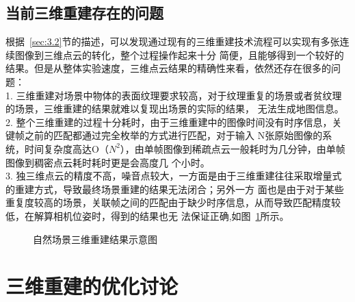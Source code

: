 \subsection{当前三维重建存在的问题}
\label{sec:3.2.3}
根据~\ref{sec:3.2}节的描述，可以发现通过现有的三维重建技术流程可以实现有多张连续图像到三维点云的转化，整个过程操作起来十分
简便，且能够得到一个较好的结果。但是从整体实验速度，三维点云结果的精确性来看，依然还存在很多的问题：\\
1. 三维重建对场景中物体的表面纹理要求较高，对于纹理重复的场景或者贫纹理的场景，三维重建的结果就难以复现出场景的实际的结果，
无法生成地图信息。\\
2. 整个三维重建的过程十分耗时，由于三维重建中的图像时间没有时序信息，关键帧之前的匹配都通过完全枚举的方式进行匹配，对于输入
N张原始图像的系统，时间复杂度高达O（$N^2$），由单帧图像到稀疏点云一般耗时为几分钟，由单帧图像到稠密点云耗时耗时更是会高度几
个小时。\\
3. 独三维点云的精度不高，噪音点较大，一方面是由于三维重建往往采取增量式的重建方式，导致最终场景重建的结果无法闭合；另外一方
面也是由于对于某些重复度较高的场景，关联帧之间的匹配由于缺少时序信息，从而导致匹配精度较低，在解算相机位姿时，得到的结果也无
法保证正确,如图~\ref{fig:chap2:3dconstr_stone}所示。
\begin{figure}[htbp]
  \centering
  \vskip0.5cm
  \caption{自然场景三维重建结果示意图}\label{fig:chap2:3dconstr_stone}
\end{figure}
\section{三维重建的优化讨论}
\label{sec:3.3}
